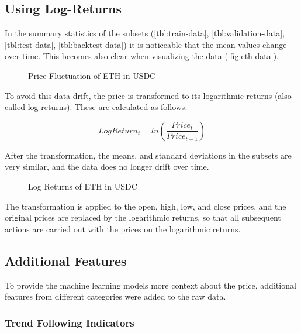 \subsection{Using Log-Returns}

In the summary statistics of the subsets (\autoref{tbl:train-data}, \autoref{tbl:validation-data}, \autoref{tbl:test-data}, \autoref{tbl:backtest-data}) it is noticeable that the mean values change over time.
This becomes also clear when visualizing the data (\autoref{fig:eth-data}).

\begin{figure}[H]
    \centering
    
    \caption{Price Fluctuation of ETH in USDC}
    \label{fig:eth-data}
\end{figure}

To avoid this data drift, the price is transformed to its logarithmic returns (also called log-returns).
These are calculated as follows:

\begin{equation}
    LogReturn_t = ln(\frac{Price_t}{Price_{t-1}})
\end{equation}

After the transformation, the means, and standard deviations in the subsets are very similar, and the data does no longer drift over time.

\begin{figure}[H]
    \centering
    
    \caption{Log Returns of ETH in USDC}
    \label{fig:eth-log-data}
\end{figure}

The transformation is applied to the open, high, low, and close prices, and the original prices are replaced by the logarithmic returns, so that all subsequent actions are carried out with the prices on the logarithmic returns.

\subsection{Additional Features}
\label{chap:additional-features}

To provide the machine learning models more context about the price, additional features from different categories were added to the raw data.

\subsubsection{Trend Following Indicators}

